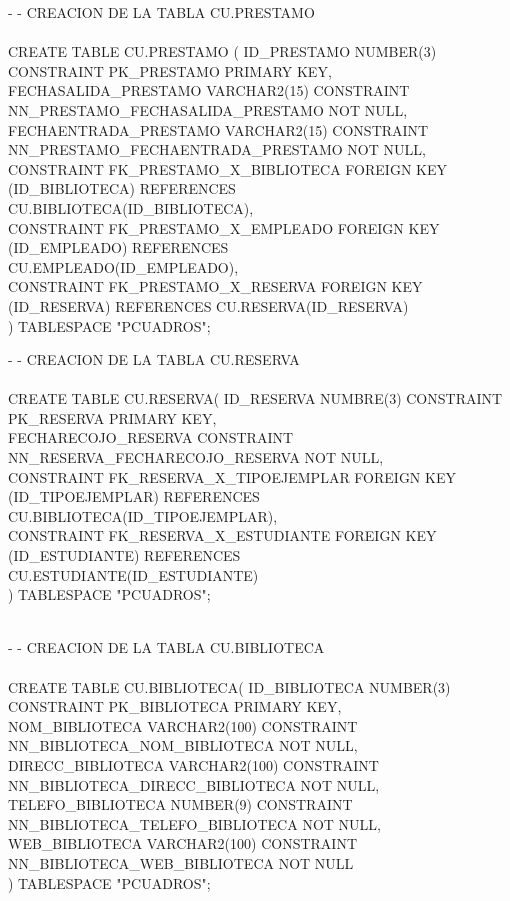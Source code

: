\documentclass[12pt,letterpaper]{article}
\begin{document}
	\normalsize
	- - CREACION DE LA TABLA CU.PRESTAMO\\\\
	\small
	CREATE TABLE CU.PRESTAMO (
	ID\_PRESTAMO NUMBER(3) CONSTRAINT PK\_PRESTAMO PRIMARY KEY,\\
	FECHASALIDA\_PRESTAMO VARCHAR2(15) CONSTRAINT NN\_PRESTAMO\_FECHASALIDA\_PRESTAMO NOT NULL,\\
	FECHAENTRADA\_PRESTAMO VARCHAR2(15) CONSTRAINT NN\_PRESTAMO\_FECHAENTRADA\newline \_PRESTAMO NOT NULL,\\
	CONSTRAINT FK\_PRESTAMO\_X\_BIBLIOTECA FOREIGN KEY (ID\_BIBLIOTECA) REFERENCES \\ CU.BIBLIOTECA(ID\_BIBLIOTECA),\\
	CONSTRAINT FK\_PRESTAMO\_X\_EMPLEADO FOREIGN KEY (ID\_EMPLEADO) REFERENCES  \\ CU.EMPLEADO(ID\_EMPLEADO),\\
	CONSTRAINT FK\_PRESTAMO\_X\_RESERVA FOREIGN KEY (ID\_RESERVA) REFERENCES CU.RESER\newline VA(ID\_RESERVA)\\
	) TABLESPACE "PCUADROS";

	\vspace{\baselineskip}
\normalsize
	- - CREACION DE LA TABLA CU.RESERVA\\\\
	\small
	CREATE TABLE CU.RESERVA(
	ID\_RESERVA NUMBRE(3) CONSTRAINT PK\_RESERVA PRIMARY KEY,\\
	FECHARECOJO\_RESERVA CONSTRAINT NN\_RESERVA\_FECHARECOJO\_RESERVA NOT NULL,\\
	CONSTRAINT FK\_RESERVA\_X\_TIPOEJEMPLAR FOREIGN KEY (ID\_TIPOEJEMPLAR) REFERENCES \\ CU.BIBLIOTECA(ID\_TIPOEJEMPLAR),\\
	CONSTRAINT FK\_RESERVA\_X\_ESTUDIANTE FOREIGN KEY (ID\_ESTUDIANTE) REFERENCES \\   CU.ESTUDIANTE(ID\_ESTUDIANTE)\\
	) TABLESPACE "PCUADROS";\\\\

	\vspace{\baselineskip}

	\newpage
	\normalsize
	- - CREACION DE LA TABLA CU.BIBLIOTECA\\\\
	\small
	CREATE TABLE CU.BIBLIOTECA(
	ID\_BIBLIOTECA NUMBER(3) CONSTRAINT PK\_BIBLIOTECA PRIMARY KEY,\\
	NOM\_BIBLIOTECA VARCHAR2(100) CONSTRAINT NN\_BIBLIOTECA\_NOM\_BIBLIOTECA NOT NULL,\\
	DIRECC\_BIBLIOTECA VARCHAR2(100) CONSTRAINT NN\_BIBLIOTECA\_DIRECC\_BIBLIOTECA NOT NULL,\\
	TELEFO\_BIBLIOTECA NUMBER(9) CONSTRAINT NN\_BIBLIOTECA\_TELEFO\_BIBLIOTECA NOT NULL,\\
	WEB\_BIBLIOTECA VARCHAR2(100) CONSTRAINT NN\_BIBLIOTECA\_WEB\_BIBLIOTECA NOT NULL\\
	) TABLESPACE "PCUADROS";
\end{document}
